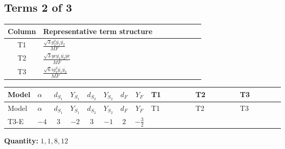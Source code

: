 \documentclass[8pt]{article}
\begin{document}
\begin{landscape}
\subsection*{Terms 2 of 3}
\begin{center}
\begin{tabular}{@{}c >{\raggedright\arraybackslash}p{0.82\linewidth}@{}}
\toprule
Column & Representative term structure \\
\midrule
T1 & \(\displaystyle \frac{\sqrt{3} g_{2}^{2} \overline{y_{1}} \overline{y_{2}}}{MF}\) \\
\midrule
T2 & \(\displaystyle \frac{\sqrt{3} ye \overline{y_{1}} \overline{y_{2}} \overline{ye}}{MF}\) \\
\midrule
T3 & \(\displaystyle \frac{\sqrt{6} i g_{2}^{2} \overline{y_{1}} \overline{y_{2}}}{MF}\) \\
\midrule
\bottomrule
\end{tabular}
\end{center}
\smallskip
\tiny
\begin{longtable}{@{}llcccccc >{\raggedright\arraybackslash}p{0.21\linewidth} >{\raggedright\arraybackslash}p{0.21\linewidth} >{\raggedright\arraybackslash}p{0.21\linewidth}@{}}
\toprule
Model & $\alpha$ & $d_{S_1}$ & $Y_{S_1}$ & $d_{S_2}$ & $Y_{S_2}$ & $d_F$ & $Y_F$ & T1 & T2 & T3 \\
\midrule
\endfirsthead
\toprule
Model & $\alpha$ & $d_{S_1}$ & $Y_{S_1}$ & $d_{S_2}$ & $Y_{S_2}$ & $d_F$ & $Y_F$ & T1 & T2 & T3 \\
\midrule
\endhead
T3-E & $-4$ & $3$ & $-2$ & $3$ & $-1$ & $2$ & $-\frac{3}{2}$ & \scriptsize\adjustbox{max width=\linewidth}{$\begin{gathered} \frac{49 \sqrt{3} g_{2}^{2} \overline{y_{1}} \overline{y_{2}}}{24 MF}\end{gathered}$} & \scriptsize\adjustbox{max width=\linewidth}{$\begin{gathered} - \frac{\sqrt{3} ye \overline{y_{1}} \overline{y_{2}} \overline{ye}}{12 MF}\end{gathered}$} & \scriptsize\adjustbox{max width=\linewidth}{$\begin{gathered} \frac{\sqrt{6} i g_{2}^{2} \overline{y_{1}} \overline{y_{2}}}{3 MF}\end{gathered}$} \\
\midrule
\bottomrule
\end{longtable}
\clearpage
\noindent\textbf{Quantity: }$\mathrm{1,1,8,12}$\par\smallskip

\end{landscape}
\end{document}
